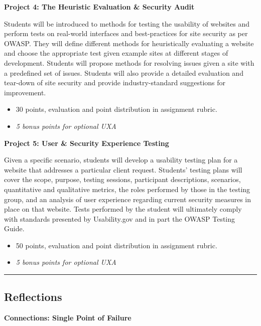 \documentclass[]{article}
\providecommand{\tightlist}{%
  \setlength{\itemsep}{0pt}\setlength{\parskip}{0pt}}
\begin{document}
\textbf{Project 4: The Heuristic Evaluation \& Security Audit}

Students will be introduced to methods for testing the usability of
websites and perform tests on real-world interfaces and best-practices
for site security as per OWASP. They will define different methods for
heuristically evaluating a website and choose the appropriate test given
example sites at different stages of development. Students will propose
methods for resolving issues given a site with a predefined set of
issues. Students will also provide a detailed evaluation and tear-down
of site security and provide industry-standard suggestions for
improvement.

\begin{itemize}
\tightlist
\item
  30 points, evaluation and point distribution in assignment rubric.
\item
  \emph{5 bonus points for optional UXA}
\end{itemize}

\textbf{Project 5: User \& Security Experience Testing}

Given a specific scenario, students will develop a usability testing
plan for a website that addresses a particular client request. Students'
testing plans will cover the scope, purpose, testing sessions,
participant descriptions, scenarios, quantitative and qualitative
metrics, the roles performed by those in the testing group, and an
analysis of user experience regarding current security measures in place
on that website. Tests performed by the student will ultimately comply
with standards presented by Usability.gov and in part the OWASP Testing
Guide.

\begin{itemize}
\tightlist
\item
  50 points, evaluation and point distribution in assignment rubric.
\item
  \emph{5 bonus points for optional UXA}
\end{itemize}

\begin{center}\rule{0.5\linewidth}{\linethickness}\end{center}

\hypertarget{reflections}{%
\subsection{Reflections}\label{reflections}}

\textbf{Connections: Single Point of Failure}
\end{document}
